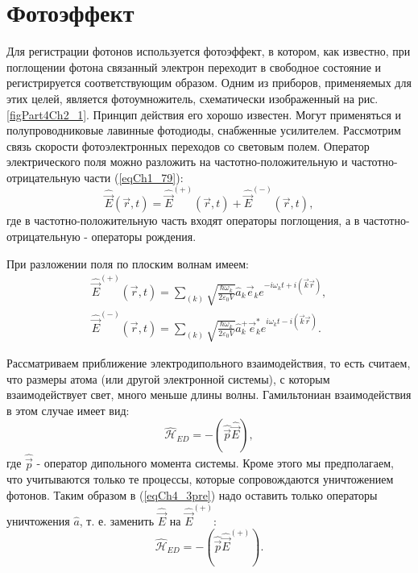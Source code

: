 \section{Фотоэффект}
Для регистрации фотонов используется фотоэффект, в котором, как
известно, при поглощении фотона связанный электрон переходит в
свободное состояние и регистрируется соответствующим
образом. Одним из приборов, применяемых для этих целей,
является фотоумножитель, схематически изображенный на
рис.\ref{figPart4Ch2_1}. Принцип действия его хорошо известен. Могут применяться
и полупроводниковые лавинные фотодиоды, снабженные
усилителем. Рассмотрим связь скорости фотоэлектронных
переходов со световым полем. Оператор электрического поля
можно разложить на частотно-положительную и
частотно-отрицательную части (\ref{eqCh1_79}): 
\begin{equation}
\hat{\vec{E}}\left(\vec{r}, t\right) = 
\hat{\vec{E}}^{(+)}\left(\vec{r}, t\right) +
\hat{\vec{E}}^{(-)}\left(\vec{r}, t\right),
\label{eqCh4_1}
\end{equation}
где в частотно-положительную часть входят операторы поглощения, а в
частотно-отрицательную - операторы рождения. 



При разложении поля по плоским волнам имеем:
\begin{eqnarray}
\hat{\vec{E}}^{(+)}\left(\vec{r}, t\right) = \sum_{(k)} \sqrt{\frac{\hbar \omega_k}{2 \varepsilon_0
V}} \hat{a}_k \vec{e}_k e^{-i \omega_k t + i \left(\vec{k}\vec{r}
  \right)},
\nonumber \\
\hat{\vec{E}}^{(-)}\left(\vec{r}, t\right) = \sum_{(k)} \sqrt{\frac{\hbar \omega_k}{2 \varepsilon_0
V}} \hat{a}_k^{+} \vec{e}_k^{*} e^{i \omega_k t - i \left(\vec{k}\vec{r}
  \right)}.
\label{eqCh4_2}
\end{eqnarray}

Рассматриваем приближение электродипольного взаимодействия, то есть
считаем, что размеры атома (или другой электронной системы), с
которым взаимодействует свет, много меньше длины
волны. Гамильтониан взаимодействия в этом случае имеет вид: 
\begin{equation}
\hat{\mathcal{H}}_{ED} = - \left(\hat{\vec{p}}\hat{\vec{E}}\right),
\label{eqCh4_3pre}
\end{equation}
где $\hat{\vec{p}}$ - оператор дипольного момента системы. 
Кроме этого мы предполагаем, что учитываются только те процессы,
которые сопровождаются уничтожением фотонов. Таким образом в
(\ref{eqCh4_3pre}) надо оставить только операторы уничтожения
$\hat{a}$, т. е. заменить $\hat{\vec{E}}$ на $\hat{\vec{E}}^{(+)}$:
\begin{equation}
\hat{\mathcal{H}}_{ED} = - \left(\hat{\vec{p}}\hat{\vec{E}}^{(+)}\right).
\label{eqCh4_3}
\end{equation}

